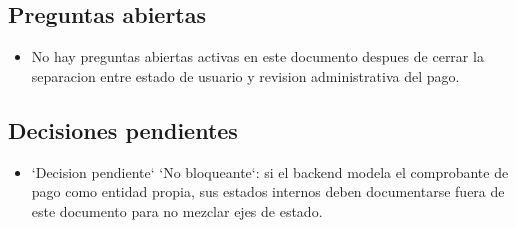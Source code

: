 \subsection{Preguntas abiertas}

\begin{itemize}
  \item No hay preguntas abiertas activas en este documento despues de cerrar la separacion entre estado de usuario y revision administrativa del pago.
\end{itemize}

\subsection{Decisiones pendientes}

\begin{itemize}
  \item `Decision pendiente` `No bloqueante`: si el backend modela el comprobante de pago como entidad propia, sus estados internos deben documentarse fuera de este documento para no mezclar ejes de estado.
\end{itemize}
